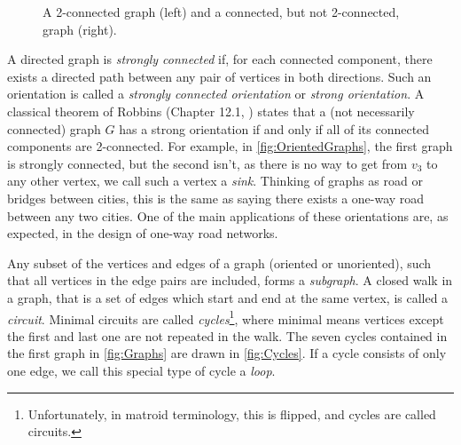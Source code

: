 \documentclass[12pt]{report}
\theoremstyle{definition}
\theoremstyle{upright}
\begin{document}
\begin{figure}[htbp]
\begin{center}
\begin{subfigure}[c]{0.45\linewidth}
\begin{center}
\begin{tikzpicture}
                \end{tikzpicture}
                
            \end{center}
            
        \end{subfigure}
    
    \end{center}

    \caption{A 2-connected graph (left) and a connected, but not 2-connected, graph (right).}\label{fig:ConnectedGraphs}

\end{figure}

A directed graph is \textit{strongly connected} if, for each connected component, there exists a directed path between any pair of vertices in both directions.
Such an orientation is called a \textit{strongly connected orientation} or \textit{strong orientation}.
A classical theorem of Robbins (Chapter 12.1, \cite{GrossYellen}) states that a (not necessarily connected) graph $G$ has a strong orientation if and only if all of its connected components are 2-connected.
For example, in \cref{fig:OrientedGraphs}, the first graph is strongly connected, but the second isn't, as there is no way to get from $v_3$ to any other vertex, we call such a vertex a \textit{sink}.
Thinking of graphs as road or bridges between cities, this is the same as saying there exists a one-way road between any two cities.
One of the main applications of these orientations are, as expected, in the design of one-way road networks.

Any subset of the vertices and edges of a graph (oriented or unoriented), such that all vertices in the edge pairs are included, forms a \textit{subgraph}.
A closed walk in a graph, that is a set of edges which start and end at the same vertex, is called a \textit{circuit}.
Minimal circuits are called \textit{cycles}\footnote{Unfortunately, in matroid terminology, this is flipped, and cycles are called circuits.}, where minimal means vertices except the first and last one are not repeated in the walk.
The seven cycles contained in the first graph in \cref{fig:Graphs} are drawn in \cref{fig:Cycles}.
If a cycle consists of only one edge, we call this special type of cycle a \textit{loop}.
\end{document}
